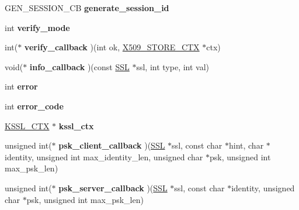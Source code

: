 \begin{DoxyCompactItemize}
\item 
\hypertarget{structssl__st_aa315242df1667bfb185bfcaa5b7ca86f}{}G\+E\+N\+\_\+\+S\+E\+S\+S\+I\+O\+N\+\_\+\+C\+B {\bfseries generate\+\_\+session\+\_\+id}\label{structssl__st_aa315242df1667bfb185bfcaa5b7ca86f}

\item 
\hypertarget{structssl__st_a7592fd603fe469b789f13bdbc55a172e}{}int {\bfseries verify\+\_\+mode}\label{structssl__st_a7592fd603fe469b789f13bdbc55a172e}

\item 
\hypertarget{structssl__st_a5891d1f44fd1385ae1c1c4e866450133}{}int($\ast$ {\bfseries verify\+\_\+callback} )(int ok, \hyperlink{structx509__store__ctx__st}{X509\+\_\+\+S\+T\+O\+R\+E\+\_\+\+C\+T\+X} $\ast$ctx)\label{structssl__st_a5891d1f44fd1385ae1c1c4e866450133}

\item 
\hypertarget{structssl__st_aaf32f29b307cfa33c4a19a7cf11bc36f}{}void($\ast$ {\bfseries info\+\_\+callback} )(const \hyperlink{structssl__st}{S\+S\+L} $\ast$ssl, int type, int val)\label{structssl__st_aaf32f29b307cfa33c4a19a7cf11bc36f}

\item 
\hypertarget{structssl__st_aca7ac14e5548bdd96990fa1d12aaef02}{}int {\bfseries error}\label{structssl__st_aca7ac14e5548bdd96990fa1d12aaef02}

\item 
\hypertarget{structssl__st_a6a6c337340e6b5986ca6a1381838c9ae}{}int {\bfseries error\+\_\+code}\label{structssl__st_a6a6c337340e6b5986ca6a1381838c9ae}

\item 
\hypertarget{structssl__st_a1b2e26d71535a556a65c577216336e31}{}\hyperlink{structkssl__ctx__st}{K\+S\+S\+L\+\_\+\+C\+T\+X} $\ast$ {\bfseries kssl\+\_\+ctx}\label{structssl__st_a1b2e26d71535a556a65c577216336e31}

\item 
\hypertarget{structssl__st_ade63f7a47c12d1957f6ccff7b374c69c}{}unsigned int($\ast$ {\bfseries psk\+\_\+client\+\_\+callback} )(\hyperlink{structssl__st}{S\+S\+L} $\ast$ssl, const char $\ast$hint, char $\ast$identity, unsigned int max\+\_\+identity\+\_\+len, unsigned char $\ast$psk, unsigned int max\+\_\+psk\+\_\+len)\label{structssl__st_ade63f7a47c12d1957f6ccff7b374c69c}

\item 
\hypertarget{structssl__st_a2e36d9d815a0c1acd8d4cae04ad88aa1}{}unsigned int($\ast$ {\bfseries psk\+\_\+server\+\_\+callback} )(\hyperlink{structssl__st}{S\+S\+L} $\ast$ssl, const char $\ast$identity, unsigned char $\ast$psk, unsigned int max\+\_\+psk\+\_\+len)\label{structssl__st_a2e36d9d815a0c1acd8d4cae04ad88aa1}


\end{DoxyCompactItemize}
